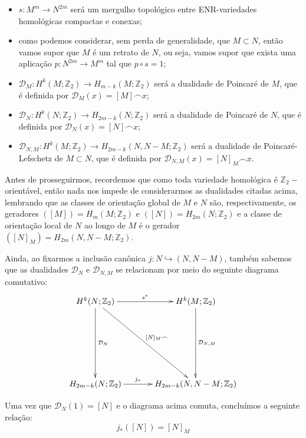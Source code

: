 \documentclass[12pt,oneside]{book} %
\newcommand{\Z}{\mathbb{Z}}
\newcommand{\ccap}{\frown}
\begin{document}
	\begin{itemize}
		\item $s:M^{m}\to N^{2m}$ será um mergulho topológico entre ENR-variedades homológicas compactas e conexas;
		\item como podemos considerar, sem perda de generalidade, que $M\subset N$, então vamos supor que $M$ é um retrato de $N$, ou seja, vamos supor que exista uma aplicação $p:N^{2m}\to M^{m}$ tal que $p\circ s=1$;
		\item $\mathcal{D}_{M}:H^{k}(M;\Z_{2})\to H_{m-k}(M;\Z_{2})$ será a dualidade de Poincaré de $M$, que é definida por $\mathcal{D}_{M}(x)=[M]\ccap x$;
		\item $\mathcal{D}_{N}:H^{k}(N;\Z_{2})\to H_{2m-k}(N;\Z_{2})$ será a dualidade de Poincaré de $N$, que é definida por $\mathcal{D}_{N}(x)=[N]\ccap x$;
		\item $\mathcal{D}_{N,M}:H^{k}(M;\Z_{2})\to H_{2m-k}(N,N-M;\Z_{2})$ será a dualidade de Poincaré-Lefschetz de $M\subset N$, que é definida por $\mathcal{D}_{N,M}(x)=[N]_{M}\ccap x$.
	\end{itemize}

\par Antes de prosseguirmos, recordemos que como toda variedade homológica é $\Z_{2}-$orientável, então nada nos impede de considerarmos as dualidades citadas acima, lembrando que as classes de orientação global de $M$ e $N$ são, respectivamente, os geradores $([M])=H_{m}(M;\Z_{2})$ e $([N])=H_{2m}(N;\Z_{2})$ e a classe de orientação local de $N$ ao longo de $M$ é o gerador $([N]_{M})=H_{2m}(N,N-M;\Z_{2})$.

\par Ainda, ao fixarmos a inclusão canônica $j:N\hookrightarrow (N,N-M)$, também sabemos que as dualidades $\mathcal{D}_{N}$ e $\mathcal{D}_{N,M}$ se relacionam por meio do seguinte diagrama comutativo:
$$ \xymatrix @C=0.5cm {
	H^{k}(N;\Z_{2}) \ar[rr]^-{s^{*}} \ar[ddd]^-{\mathcal{D}_{N}} \ar[rrddd]^-{[N]_{M}\ccap} && H^{k}(M;\Z_{2}) \ar[ddd]^-{\mathcal{D}_{N,M}} \\
	&& \\
	&& \\
	H_{2m-k}(N;\Z_{2}) \ar[rr]^-{j_{*}} && H_{2m-k}(N,N-M;\Z_{2})
} $$

\par Uma vez que $\mathcal{D}_{N}(1)=[N]$ e o diagrama acima comuta, concluímos a seguinte relação:
$$ j_{*}([N])=[N]_{M} $$
\end{document}
